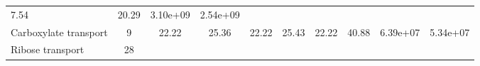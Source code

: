 \documentclass[]{article}
\begin{document}
\begin{longtable}[]{@{}lccccccccc@{}}
\begin{minipage}[t]{0.08\columnwidth}
7.54\strut
\end{minipage} & \begin{minipage}[t]{0.08\columnwidth}\centering\strut
20.29\strut
\end{minipage} & \begin{minipage}[t]{0.08\columnwidth}\centering\strut
3.10e+09\strut
\end{minipage} & \begin{minipage}[t]{0.08\columnwidth}\centering\strut
2.54e+09\strut
\end{minipage}\tabularnewline
\begin{minipage}[t]{0.07\columnwidth}\raggedright\strut
Carboxylate transport\strut
\end{minipage} & \begin{minipage}[t]{0.06\columnwidth}\centering\strut
9\strut
\end{minipage} & \begin{minipage}[t]{0.08\columnwidth}\centering\strut
22.22\strut
\end{minipage} & \begin{minipage}[t]{0.08\columnwidth}\centering\strut
25.36\strut
\end{minipage} & \begin{minipage}[t]{0.08\columnwidth}\centering\strut
22.22\strut
\end{minipage} & \begin{minipage}[t]{0.08\columnwidth}\centering\strut
25.43\strut
\end{minipage} & \begin{minipage}[t]{0.08\columnwidth}\centering\strut
22.22\strut
\end{minipage} & \begin{minipage}[t]{0.08\columnwidth}\centering\strut
40.88\strut
\end{minipage} & \begin{minipage}[t]{0.08\columnwidth}\centering\strut
6.39e+07\strut
\end{minipage} & \begin{minipage}[t]{0.08\columnwidth}\centering\strut
5.34e+07\strut
\end{minipage}\tabularnewline
\begin{minipage}[t]{0.07\columnwidth}\raggedright\strut
Ribose transport\strut
\end{minipage} & \begin{minipage}[t]{0.06\columnwidth}\centering\strut
28\strut
\end{minipage} & \begin{minipage}[t]{0.08\columnwidth}\centering\strut

\end{minipage}
\end{longtable}
\end{document}
